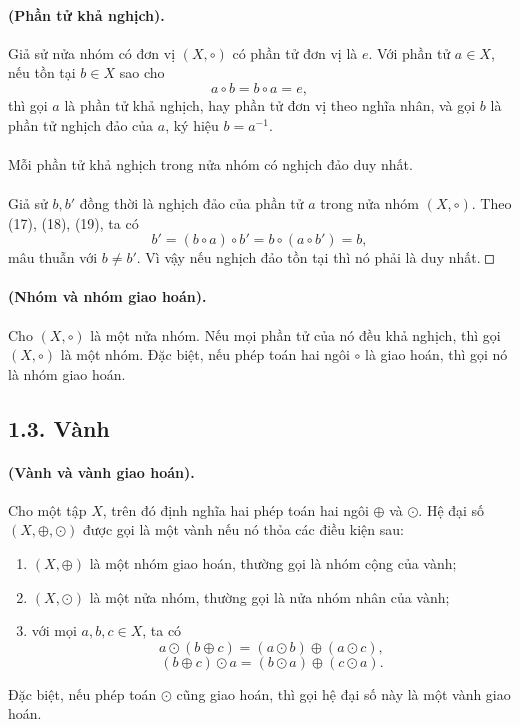 \documentclass[11pt]{article}
\newcommand{\square}{\mathord{\vcenter{\hrule height .5pt
  \hbox{\vrule width .5pt height 5pt\kern5pt\vrule width .5pt}
  \hrule height .5pt}}}
\begin{document}
\paragraph{ (Phần tử khả nghịch).}
Giả sử nửa nhóm có đơn vị \((X,\circ)\) có phần tử đơn vị là \(e\). Với phần
tử \(a\in X\), nếu tồn tại \(b\in X\) sao cho
\[
  a\circ b=b\circ a=e,
\tag{19}
\]
thì gọi \(a\) là phần tử khả nghịch, hay phần tử đơn vị theo nghĩa nhân, và
gọi \(b\) là phần tử nghịch đảo của \(a\), ký hiệu \(b=a^{-1}\).

\paragraph{}
Mỗi phần tử khả nghịch trong nửa nhóm có nghịch đảo duy nhất.

\paragraph{}
Giả sử \(b,b'\) đồng thời là nghịch đảo của phần tử \(a\) trong nửa nhóm
\((X,\circ)\). Theo (17), (18), (19), ta có
\[
  b'=(b\circ a)\circ b'=b\circ(a\circ b')=b,
\]
mâu thuẫn với \(b\ne b'\). Vì vậy nếu nghịch đảo tồn tại thì nó phải là duy
nhất. \(\square\)

\paragraph{ (Nhóm và nhóm giao hoán).}
Cho \((X,\circ)\) là một nửa nhóm. Nếu mọi phần tử của nó đều khả nghịch, thì
gọi \((X,\circ)\) là một nhóm. Đặc biệt, nếu phép toán hai ngôi \(\circ\) là
giao hoán, thì gọi nó là nhóm giao hoán.

\subsection*{1.3. Vành}

\paragraph{ (Vành và vành giao hoán).}
Cho một tập \(X\), trên đó định nghĩa hai phép toán hai ngôi \(\oplus\) và
\(\odot\). Hệ đại số \((X,\oplus,\odot)\) được gọi là một vành nếu nó thỏa
các điều kiện sau:
\begin{enumerate}
  \item \((X,\oplus)\) là một nhóm giao hoán, thường gọi là nhóm cộng của
        vành;
  \item \((X,\odot)\) là một nửa nhóm, thường gọi là nửa nhóm nhân của vành;
  \item với mọi \(a,b,c\in X\), ta có
        \[
          a\odot(b\oplus c)=(a\odot b)\oplus(a\odot c),
        \]
        \[
          (b\oplus c)\odot a=(b\odot a)\oplus(c\odot a).
        \]
\end{enumerate}
Đặc biệt, nếu phép toán \(\odot\) cũng giao hoán, thì gọi hệ đại số này là
một vành giao hoán.
\end{document}
